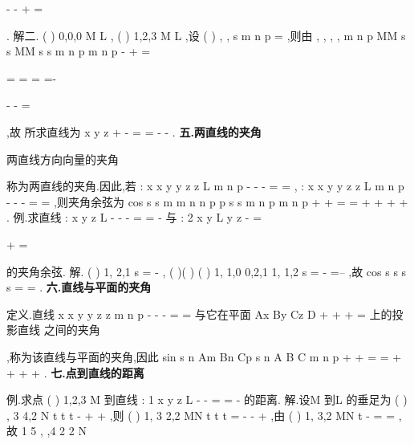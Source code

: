 -
-
+
=

. 
解二.
(
)
0,0,0
M
L
\in 
,
(
)
1,2,3
M
L
\in 
,设
(
)
, ,
s
m n p
=
\rho 
,则由 
,
,
,
,
m
n
p
MM s s
MM
s s
m
n
p
m
n
p
-
+
=





=
=
\Rightarrow 
\Rightarrow 
=
=-





-
-
=

\xi \xi \xi \xi \xi \rho 
\xi \xi \xi \xi \xi \rho 
\rho \rho 
\rho \rho 
,故 
所求直线为
x
y
z
+
-
=
=
-
-
. 
\vspace{4pt}
{\bfseries \textcolor{lyred}{五.两直线的夹角}}

两直线方向向量的夹角
\pi 
\theta 
\theta 


\le 
\le 




称为两直线的\textcolor{lyred}{夹角}.因此,若 
: x
x
y
y
z
z
L
m
n
p
-
-
-
=
=
,
: x
x
y
y
z
z
L
m
n
p
-
-
-
=
=
,则夹角余弦为 
cos
s s
m m
n n
p p
s s
m
n
p
m
n
p
\theta 
\cdots 
+
+
=
=
+
+
+
+
\rho \rho 
\rho \rho 
. 
\textcolor{lyred}{例}.求直线
:
x
y
z
L
-
-
-
=
=
-
与
: 2
x
y
L
y
z
-
=


+
=

的夹角余弦. 
解.
(
)
1, 2,1
s =
-
\rho 
,
(
)(
)
(
)
1, 1,0
0,2,1
1, 1,2
s =
-
\times 
=--
\rho 
,故
cos
s s
s s
\theta 
\cdots 
=
=
\rho \rho 
\rho \rho 
. 
\vspace{4pt}
{\bfseries \textcolor{lyred}{六.直线与平面的夹角}}

\textcolor{lyred}{定义}.直线
x
x
y
y
z
z
m
n
p
-
-
-
=
=
与它在平面
Ax
By
Cz
D
+
+
+
=
上的投影直线 
之间的夹角
\pi 
\varphi 
\varphi 


\le 
\le 




,称为该直线与平面的\textcolor{lyred}{夹角},因此 
sin
s n
Am
Bn
Cp
s n
A
B
C
m
n
p
\varphi 
\cdots 
+
+
=
=
+
+
\cdots 
+
+
\rho \rho 
\rho \rho 
. 
\vspace{4pt}
{\bfseries \textcolor{lyred}{七.点到直线的距离}}

\textcolor{lyred}{例}.求点
(
)
1,2,3
M
到直线
: 1
x
y
z
L
-
-
=
=
-
的距离. 
解.设M 到L 的垂足为
(
)
, 3
4,2
N t
t
t
-
+
+
,则
(
)
1, 3
2,2
MN
t
t
t
=
-
-
+
\xi \xi \xi \xi \rho 
,由 
(
)
1, 3,2
MN
t
\cdots 
-
=
\Rightarrow =
\xi \xi \xi \xi \rho 
,故
1 5
,
,4
2 2
N 





